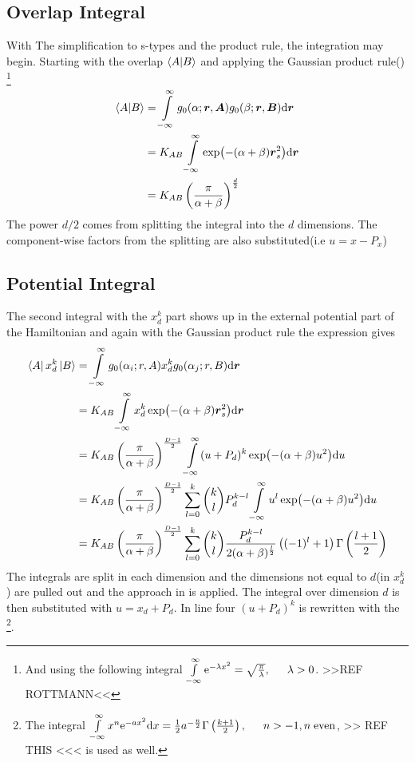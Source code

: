 \subsection{Overlap Integral}
    With The simplification to s-types and the product rule, the integration
    may begin. Starting with the overlap $\braket{A}{B}$ and applying the
    Gaussian product rule() \footnote{And using the
    following integral $\infint \me^{-\lambda x^2} =
    \sqrt{\frac{\pi}{\lambda}},\indent \lambda>0$. >>REF ROTTMANN<<}
        \begin{align}
            \braket{A}{B} &= \int\limits^{\infty}_{-\infty} g_0(\alpha;\boldsymbol{{r}},\boldsymbol{{A}})
            g_0(\beta;\boldsymbol{{r}},\boldsymbol{{B}}) \mathrm{d}\boldsymbol{{r}} \nonumber \\
            &= K_{AB}\int\limits^{\infty}_{-\infty} \exp(-(\alpha+\beta)\boldsymbol{{r}}^2_s) \mathrm{d} \boldsymbol{{r}}
            \nonumber \\
            &= K_{AB} \left(\frac{\pi}{\alpha+\beta}\right)^{\frac{d}{2}}
            \label{eq:stypeOverlap}
        \end{align}
    The power $d/2$ comes from splitting the integral into the $d$ dimensions.
    The component-wise factors from the splitting are also substituted(i.e
    $u=x-P_x$)

\subsection{Potential Integral}
    The second integral with the $x^k_d$ part shows up in the external
    potential part of the Hamiltonian and again with the Gaussian product rule
    the expression gives
        \begin{align}
            \bra{A}x^k_d\ket{B} &= \int\limits^{\infty}_{-\infty} g_0(\alpha_i;r,A) x^k_d
            g_0(\alpha_j;r,B) \mathrm{d} \boldsymbol{{r}} \nonumber \\
            &= K_{AB} \int\limits^{\infty}_{-\infty} x^k_d \exp(-(\alpha+\beta)\boldsymbol{{r}}^2_s)
            \mathrm{d}\boldsymbol{{r}} \nonumber \\
            &= K_{AB} \left(\frac{\pi}{\alpha+\beta}\right)^{\frac{D-1}{2}}
            \int\limits^{\infty}_{-\infty} (u+P_d)^k\exp(-(\alpha+\beta)u^2) \mathrm{d} u \nonumber \\
            &= K_{AB} \left(\frac{\pi}{\alpha+\beta}\right)^{\frac{D-1}{2}}
            \sum\limits_{l=0}^k {k\choose l} P^{k-l}_d \int\limits^{\infty}_{-\infty}
            u^l\exp(-(\alpha+\beta)u^2) \mathrm{d} u \nonumber \\
            &= K_{AB} \left(\frac{\pi}{\alpha+\beta}\right)^{\frac{D-1}{2}}
            \sum\limits_{l=0}^k {k\choose l}
            \frac{P^{k-l}_d}{2(\alpha+\beta)^{\frac{l}{2}}}
            \left((-1)^l+1\right) \Gamma\left(\frac{l+1}{2}\right)
        \end{align}
    The integrals are split in each dimension and the dimensions not equal to
    $d$(in $x^k_d$) are pulled out and the approach in  is
    applied. The integral over dimension $d$ is then substituted with
    $u=x_d+P_d$. In line four $(u+P_d)^k$ is rewritten with the \footnote{The integral $\infint x^n\me^{-ax^2}\md x =
    \frac{1}{2}a^{-\frac{n}{2}}\Gamma\left(\frac{k+1}{2}\right),\indent n>-1,
    n\;\text{even}$, >> REF THIS <<< is used as well.}.


